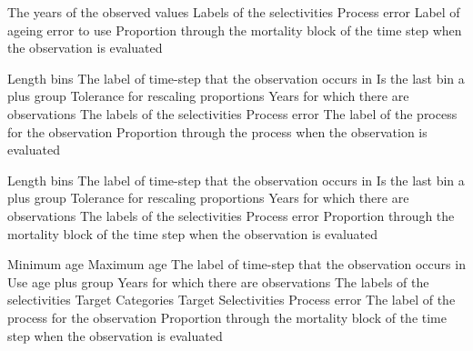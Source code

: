  {The years of the observed values}
 {Labels of the selectivities}
 {Process error}
 {Label of ageing error to use}
 {Proportion through the mortality block of the time step when the observation is evaluated}
\par\textbf{}\par
{} {Length bins}
 {The label of time-step that the observation occurs in}
 {Is the last bin a plus group}
 {Tolerance for rescaling proportions}
 {Years for which there are observations}
 {The labels of the selectivities}
 {Process error}
 {The label of the process for the observation}
 {Proportion through the process when the observation is evaluated}
\par\textbf{}\par
{} {Length bins}
 {The label of time-step that the observation occurs in}
 {Is the last bin a plus group}
 {Tolerance for rescaling proportions}
 {Years for which there are observations}
 {The labels of the selectivities}
 {Process error}
 {Proportion through the mortality block of the time step when the observation is evaluated}
\par\textbf{}\par
{} {Minimum age}
 {Maximum age}
 {The label of time-step that the observation occurs in}
 {Use age plus group}
 {Years for which there are observations}
 {The labels of the selectivities}
 {Target Categories}
 {Target Selectivities}
 {Process error}
 {The label of the process for the observation}
 {Proportion through the mortality block of the time step when the observation is evaluated}
\par\textbf{}\par
